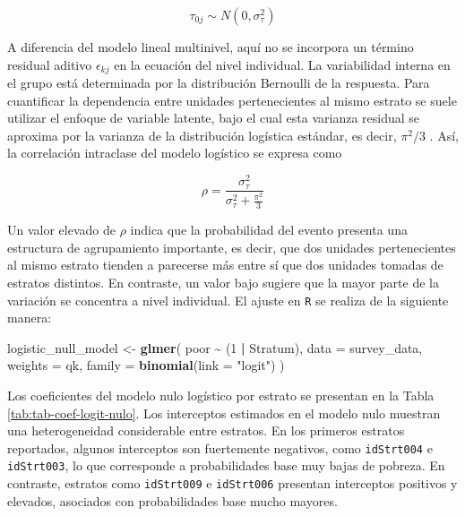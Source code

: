 \documentclass[
  spanish,
  12pt,
]{book}
\newenvironment{Shaded}{\begin{snugshade}}{\end{snugshade}}
\newcommand{\AttributeTok}[1]{\textcolor[rgb]{0.13,0.29,0.53}{#1}}
\newcommand{\DecValTok}[1]{\textcolor[rgb]{0.00,0.00,0.81}{#1}}
\newcommand{\FunctionTok}[1]{\textcolor[rgb]{0.13,0.29,0.53}{\textbf{#1}}}
\newcommand{\NormalTok}[1]{#1}
\newcommand{\OtherTok}[1]{\textcolor[rgb]{0.56,0.35,0.01}{#1}}
\newcommand{\SpecialCharTok}[1]{\textcolor[rgb]{0.81,0.36,0.00}{\textbf{#1}}}
\newcommand{\StringTok}[1]{\textcolor[rgb]{0.31,0.60,0.02}{#1}}
\begin{document}
\[
\tau_{0j} \sim N(0,\sigma_{\tau}^{2})
\]

A diferencia del modelo lineal multinivel, aquí no se incorpora un término residual aditivo \(\epsilon_{kj}\) en la ecuación del nivel individual. La variabilidad interna en el grupo está determinada por la distribución Bernoulli de la respuesta. Para cuantificar la dependencia entre unidades pertenecientes al mismo estrato se suele utilizar el enfoque de variable latente, bajo el cual esta varianza residual se aproxima por la varianza de la distribución logística estándar, es decir, \(\pi^2/3\) \citep{snijders2011}. Así, la correlación intraclase del modelo logístico se expresa como

\[
\rho =
\frac{\sigma_\tau^2}
{\sigma_\tau^2 + \frac{\pi^2}{3}}
\]

Un valor elevado de \(\rho\) indica que la probabilidad del evento presenta una estructura de agrupamiento importante, es decir, que dos unidades pertenecientes al mismo estrato tienden a parecerse más entre sí que dos unidades tomadas de estratos distintos. En contraste, un valor bajo sugiere que la mayor parte de la variación se concentra a nivel individual. El ajuste en \texttt{R} se realiza de la siguiente manera:

\begin{Shaded}
\begin{Highlighting}[]
\NormalTok{logistic\_null\_model }\OtherTok{\textless{}{-}} \FunctionTok{glmer}\NormalTok{(}
\NormalTok{  poor }\SpecialCharTok{\textasciitilde{}}\NormalTok{ (}\DecValTok{1} \SpecialCharTok{|}\NormalTok{ Stratum),}
  \AttributeTok{data =}\NormalTok{ survey\_data,}
  \AttributeTok{weights =}\NormalTok{ qk,}
  \AttributeTok{family =} \FunctionTok{binomial}\NormalTok{(}\AttributeTok{link =} \StringTok{"logit"}\NormalTok{)}
\NormalTok{)}
\end{Highlighting}
\end{Shaded}

Los coeficientes del modelo nulo logístico por estrato se presentan en la Tabla \ref{tab:tab-coef-logit-nulo}. Los interceptos estimados en el modelo nulo muestran una heterogeneidad considerable entre estratos. En los primeros estratos reportados, algunos interceptos son fuertemente negativos, como \texttt{idStrt004} e \texttt{idStrt003}, lo que corresponde a probabilidades base muy bajas de pobreza. En contraste, estratos como \texttt{idStrt009} e \texttt{idStrt006} presentan interceptos positivos y elevados, asociados con probabilidades base mucho mayores.
\end{document}
